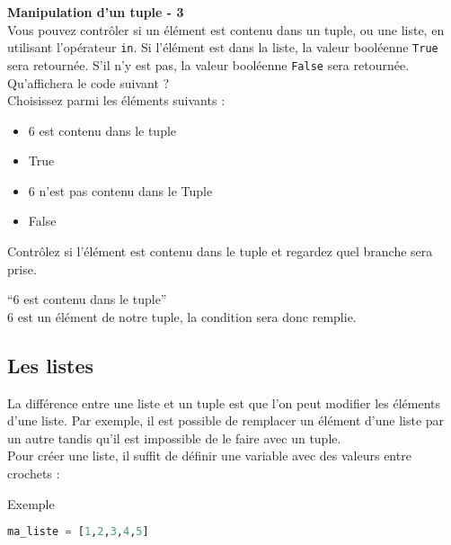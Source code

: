     \begin{Exercice}[5 minutes] \textbf{Manipulation d'un tuple - 3}\\
        Vous pouvez contrôler si un élément est contenu dans un tuple, ou une liste, en utilisant l'opérateur \lstinline{in}. Si l'élément est dans la liste, la valeur booléenne \lstinline{True} sera retournée. S'il n'y est pas, la valeur booléenne \lstinline{False} sera retournée. \\
        
        Qu'affichera le code suivant ? \\
        
        
        
        Choisissez parmi les éléments suivants : \\
        
        \begin{itemize}
        \item 6 est contenu dans le tuple
        \item True
        \item 6 n'est pas contenu dans le Tuple
        \item False \\
        \end{itemize}
    
        \begin{conseil}
            Contrôlez si l'élément est contenu dans le tuple et regardez quel branche sera prise.
        \end{conseil}
        
        \begin{solution}
           ``6 est contenu dans le tuple'' \\
           6 est un élément de notre tuple, la condition sera donc remplie.
        \end{solution}
    \end{Exercice}
    
    \subsection{Les listes}
    La différence entre une liste et un tuple est que l'on peut modifier les éléments d'une liste. Par exemple, il est possible de remplacer un élément d'une liste par un autre tandis qu'il est impossible de le faire avec un tuple.
    \\
    Pour créer une liste, il suffit de définir une variable avec des valeurs entre crochets :
    \begin{Example}{\faTerminal \quad Exemple}
        \begin{lstlisting}[language=Python]
            ma_liste = [1,2,3,4,5]   \end{lstlisting}
    \end{Example}
    
